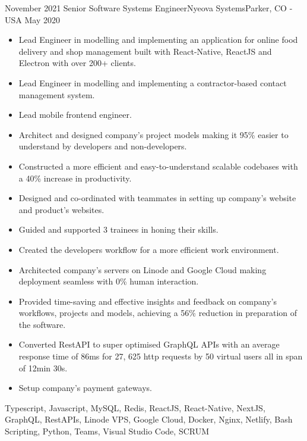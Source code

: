 %
%
%

\begin{experiences}
  
      \experience
    {November 2021}   {Senior Software Systems Engineer}{Nyeova Systems}{Parker, CO - USA}
    {May 2020} {
                      \begin{itemize}
                         \item	Lead Engineer in modelling and implementing an application for online food delivery and shop management built with React-Native, ReactJS and Electron with over 200+ clients.
                         \item Lead Engineer in modelling and implementing a contractor-based contact management system.
			\item Lead mobile frontend engineer.
			\item Architect and designed company's project models making it 95\% easier to understand by developers and non-developers.
			\item Constructed a more efficient and easy-to-understand scalable codebases with a 40\% increase in productivity.
			\item Designed and co-ordinated with teammates in setting up company's website and product's websites.
			\item Guided and supported 3 trainees in honing their skills.
			\item Created the developers workflow for a more efficient work environment.
			\item Architected company’s servers on Linode and Google Cloud making deployment seamless with 0\% human interaction.
			\item Provided time-saving and effective insights and feedback on company's workflows, projects and models, achieving a 56\% reduction in preparation of the software.
			\item Converted RestAPI to super optimised GraphQL APIs with an average response time of 86ms for 27, 625 http requests by 50 virtual users all in span of 12min 30s.
			\item Setup company's payment gateways.
		    \end{itemize}
                    }
                    {Typescript, Javascript, MySQL, Redis, ReactJS, React-Native, NextJS, GraphQL, RestAPIs, Linode VPS, Google Cloud, Docker, Nginx, Netlify, Bash Scripting, Python, Teams, Visual Studio Code, SCRUM}
  \emptySeparator
  

\end{experiences}
